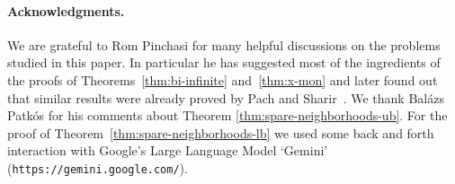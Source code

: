 \documentclass[11pt]{article}
\theoremstyle{definition}
\begin{document}
\paragraph{Acknowledgments.}
We are grateful to Rom Pinchasi for many helpful discussions on the problems studied in this paper. 
In particular he has suggested most of the ingredients of the proofs of Theorems~\ref{thm:bi-infinite} and~\ref{thm:x-mon} and later found out that similar results were already proved by Pach and Sharir~\cite{Pach-Sharir}.
We thank Bal\'azs Patk\'os for his comments about Theorem \ref{thm:spare-neighborhoods-ub}.
For the proof of Theorem~\ref{thm:spare-neighborhoods-lb} we used some back and forth interaction with Google's Large Language Model `Gemini' (\texttt{https://gemini.google.com/}).

\footnotesize


\end{document}
